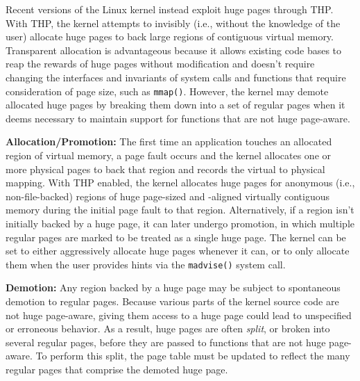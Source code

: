 Recent versions of the Linux kernel instead exploit huge pages through THP.
With THP, the kernel attempts to invisibly (i.e., without the knowledge of the
user) allocate huge pages to back large regions of contiguous virtual memory.
Transparent allocation is advantageous because it allows existing code bases to
reap the rewards of huge pages without modification and doesn't require changing
the interfaces and invariants of system calls and functions that require
consideration of page size, such as \texttt{mmap()}.  However, the kernel may
demote allocated huge pages by breaking them down into a set of regular pages
when it deems necessary  to maintain support for functions that are not huge
page-aware.

\textbf{Allocation/Promotion:} The first time an application touches an
allocated region of virtual memory, a page fault occurs and the kernel allocates
one or more physical pages to back that region and records the virtual to
physical mapping.  With THP enabled, the kernel allocates huge pages for
anonymous (i.e., non-file-backed) regions of huge page-sized and -aligned
virtually contiguous memory during the initial page fault to that region.
Alternatively, if a region isn't initially backed by a huge page, it can later
undergo promotion, in which multiple regular pages are marked to be treated as a
single huge page.  The kernel can be set to either aggressively allocate huge
pages whenever it can, or to only allocate them when the user provides hints via
the \texttt{madvise()} system call.

\textbf{Demotion:} Any region backed by a huge page may be subject to
spontaneous demotion to regular pages.  Because various parts of the kernel
source code are not huge page-aware, giving them access to a huge page could
lead to unspecified or erroneous behavior.  As a result, huge pages are often
\emph{split}, or broken into several regular pages, before they are passed to
functions that are not huge page-aware.  To perform this split, the page table
must be updated to reflect the many regular pages that comprise the demoted huge
page.

